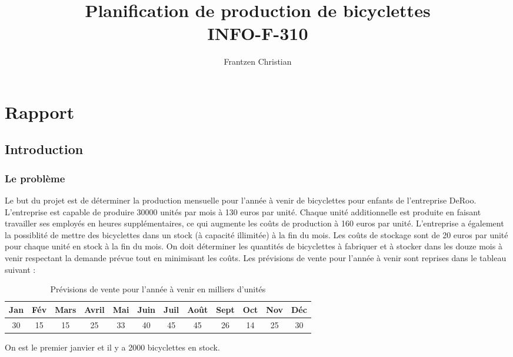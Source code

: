 \documentclass[11pt,a4paper]{report}
\author{Frantzen Christian}
\title{Planification de production de bicyclettes\\
		INFO-F-310}
\begin{document}
\maketitle
\chapter*{Rapport}
\section*{Introduction}
\subsection*{Le problème}
Le but du projet est de déterminer la production mensuelle pour l'année à venir de bicyclettes pour enfants de l'entreprise DeRoo. L'entreprise est capable de produire 30000 unités par mois à 130 euros par unité. Chaque unité additionnelle est produite en faisant travailler ses employés en heures supplémentaires, ce qui augmente les coûts de production à 160 euros par unité.\newline
L'entreprise a également la possiblité de mettre des bicyclettes dans un stock (à capacité illimitée) à la fin du mois. Les coûts de stockage sont de 20 euros par unité pour chaque unité en stock à la fin du mois. \newline
On doit déterminer les quantités de bicyclettes à fabriquer et à stocker dans les douze mois à venir respectant la demande prévue tout en minimisant les coûts. Les prévisions de vente pour l'année à venir sont reprises dans le tableau suivant :
\begin{table}[h]
\centering
\caption{Prévisions de vente pour l'année à venir en milliers d'unités}
\begin{tabular}{ |c |c| c| c| c| c| c| c| c| c| c| c|}
\hline
 Jan & Fév & Mars & Avril & Mai & Juin & Juil & Août & Sept & Oct & Nov & Déc\\  
 \hline
 30 & 15 & 15 & 25 & 33 & 40 & 45 & 45 & 26 & 14 & 25 & 30 \\
 \hline
\end{tabular}
\end{table}
\newline
On est le premier janvier et il y a 2000 bicyclettes en stock.
\end{document}
